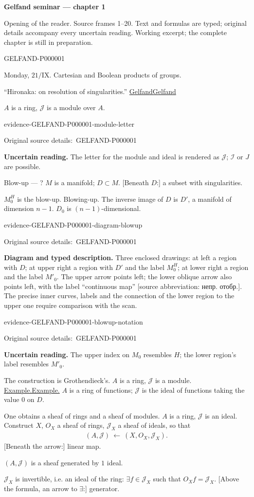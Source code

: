 \documentclass[11pt]{article}
\let\MathUnderline\underline
\renewcommand{\underline}[1]{\ifmmode\MathUnderline{#1}\else\uline{#1}\fi}
\newcommand{\SourcePage}[2]{\par\smallskip\phantomsection\label{#1:source-page}{\small\sffamily\color{blue!55!black}#1}\par\smallskip}
\newcommand{\EvidenceBlock}[4]{%
 \par\smallskip\noindent\begin{minipage}{\linewidth}
 \begin{minipage}[t]{.47\linewidth}\vspace{0pt}\centering
 \csname evidence-#1-#2\endcsname\par
 {\scriptsize\SourceCropCaption\ #1}\par
 \end{minipage}\hfill
 \begin{minipage}[t]{.49\linewidth}\vspace{0pt}\raggedright
 {\small\color{orange!65!black}\textbf{#4} #3}\par
 \end{minipage}
 \end{minipage}\par\smallskip}
\newcommand{\Unclear}[3]{\EvidenceBlock{#1}{#2}{#3}{\ReadingCaption}}
\newcommand{\SourceFigure}[3]{\EvidenceBlock{#1}{#2}{#3}{\DiagramCaption}}
\newcommand{\SourceCropCaption}{Original source details:}\newcommand{\ReadingCaption}{Uncertain reading.}\newcommand{\IncompleteCaption}{Undeciphered passage.}\newcommand{\DiagramCaption}{Diagram and typed description.}
\begin{document}
{\large\bfseries Gelfand seminar — chapter 1}\par
{\small Opening of the reader. Source frames 1–20. Text and formulas are typed; original details accompany every uncertain reading. Working excerpt; the complete chapter is still in preparation.}\par\medskip
\SourcePage{GELFAND-P000001}{unlabelled}
Monday, $21/\mathrm{IX}$.
Cartesian and Boolean products of groups.

``Hironaka: on resolution of singularities.''
\underline{Gelfand}

$A$ is a ring, $\mathcal{J}$ is a module over $A$.
\Unclear{GELFAND-P000001}{module-letter}{The letter for the module and ideal is rendered as $\mathcal{J}$; $\mathcal{I}$ or $J$ are possible.}

Blow-up --- ?
$M$ is a manifold; $D\subset M$.
[Beneath $D$:] a subset with singularities.

$M_0^H$ is the blow-up. Blowing-up.
The inverse image of $D$ is $D'$, a manifold of dimension $n-1$.
$D_0$ is $(n-1)$-dimensional.
\SourceFigure{GELFAND-P000001}{diagram-blowup}{Three enclosed drawings: at left a region with $D$; at upper right a region with $D'$ and the label $M_0^H$; at lower right a region and the label $M'_0$. The upper arrow points left; the lower oblique arrow also points left, with the label ``continuous map'' [source abbreviation: непр. отобр.]. The precise inner curves, labels and the connection of the lower region to the upper one require comparison with the scan.}
\Unclear{GELFAND-P000001}{blowup-notation}{The upper index on $M_0$ resembles $H$; the lower region's label resembles $M'_0$.}

The construction is Grothendieck's.
$A$ is a ring, $\mathcal{J}$ is a module.
\underline{Example.} $A$ is a ring of functions;
$\mathcal{J}$ is the ideal of functions taking the value $0$ on $D$.

One obtains a sheaf of rings and a sheaf of modules.
$A$ is a ring, $\mathcal{J}$ is an ideal.
Construct $X$, $O_X$ a sheaf of rings,
$\mathcal{J}_X$ a sheaf of ideals, so that
\begin{gather*}
 (A,\mathcal{J})\ \longleftarrow\ (X,O_X,\mathcal{J}_X).
\end{gather*}
[Beneath the arrow:] linear map.

$(A,\mathcal{J})$ is a sheaf generated by $1$ ideal.

$\mathcal{J}_X$ is invertible, i.e. an ideal of the ring:
$\exists f\in\mathcal{J}_X$ such that $O_Xf=\mathcal{J}_X$.
[Above the formula, an arrow to $\exists$:] generator.
\end{document}
